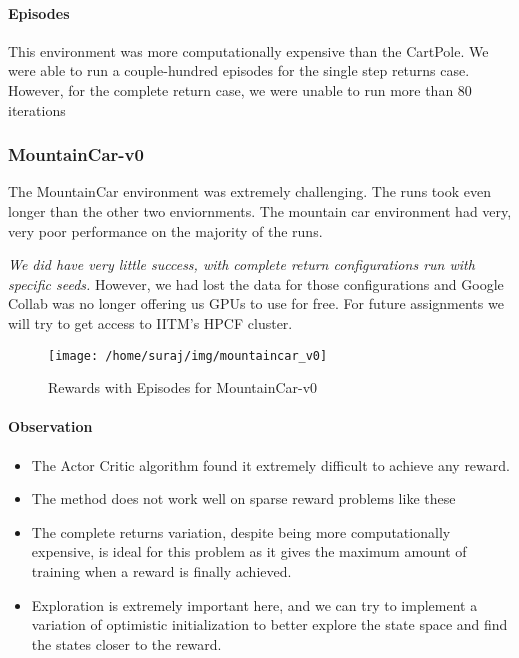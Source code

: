 \documentclass[A4]{article}
\begin{document}
    \paragraph{Episodes} This environment was more computationally expensive than the CartPole.
    We were able to run a couple-hundred episodes for the single step returns case.
    However, for the complete return case, we were unable to run more than 80 iterations

    \subsubsection{MountainCar-v0}

    The MountainCar environment was extremely challenging.
    The runs took even longer than the other two enviornments.
    The mountain car environment had very, very poor performance on the majority of the runs.

    \emph{We did have very little success, with complete return configurations run with specific seeds.}
    However, we had lost the data for those configurations and Google Collab was no longer offering us GPUs to use for free.
    For future assignments we will try to get access to IITM's HPCF cluster.

    \begin{figure}[h]
        \centering
        \texttt{[image: /home/suraj/img/mountaincar\_v0]}
        \caption{Rewards with Episodes for MountainCar-v0}
        \label{fig:}
    \end{figure}

    \paragraph{Observation}
    \begin{itemize}
        \item The Actor Critic algorithm found it extremely difficult to achieve any reward.
        \item The method does not work well on sparse reward problems like these
        \item The complete returns variation, despite being more computationally expensive, is ideal for this problem as it gives the maximum amount of training when a reward is finally achieved.
        \item Exploration is extremely important here, and we can try to implement a variation of optimistic initialization to better explore the state space and find the states closer to the reward.
    \end{itemize}
\end{document}
